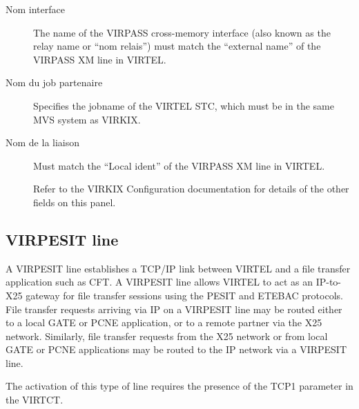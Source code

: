\documentclass[letterpaper,10pt,english]{sphinxmanual}
\begin{document}
\begin{description}
\item[{Nom interface}] \leavevmode
The name of the VIRPASS cross-memory interface (also known as the
relay name or “nom relais”) must match the “external name” of the
VIRPASS XM line in VIRTEL.

\item[{Nom du job partenaire}] \leavevmode
Specifies the jobname of the VIRTEL STC, which must be in the same
MVS system as VIRKIX.

\item[{Nom de la liaison}] \leavevmode
Must match the “Local ident” of the VIRPASS XM line in VIRTEL.

Refer to the VIRKIX Configuration documentation for details of the
other fields on this panel.

\end{description}


\subsection{VIRPESIT line}
\label{\detokenize{connectivity_guide:virpesit-line}}
A VIRPESIT line establishes a TCP/IP link between VIRTEL and a file transfer application such as CFT. A VIRPESIT line allows VIRTEL to act as an IP-to-X25 gateway for file transfer sessions using the PESIT and ETEBAC protocols. File transfer requests arriving via IP on a VIRPESIT line may be routed either to a local GATE or PCNE application, or to a remote partner via the X25 network. Similarly, file transfer requests from the X25 network or from local GATE or PCNE applications may be routed to the IP network via a VIRPESIT line.

The activation of this type of line requires the presence of the TCP1 parameter in the VIRTCT.

\end{document}
